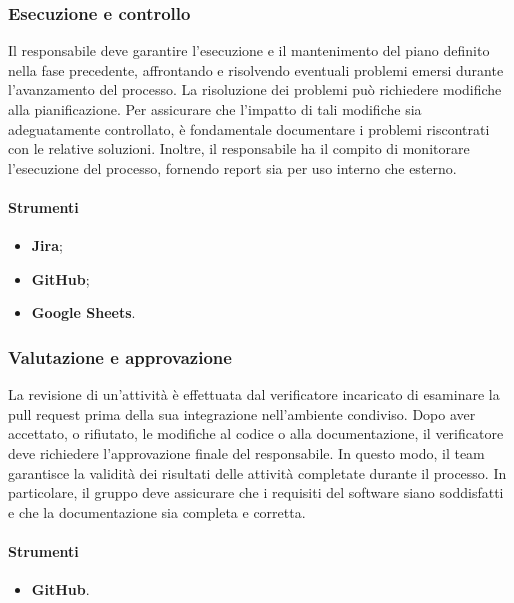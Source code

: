 \subsubsection{Esecuzione e controllo}
\par Il responsabile deve garantire l'esecuzione e il mantenimento del piano definito nella fase precedente, affrontando e risolvendo eventuali problemi emersi durante l'avanzamento del processo. La risoluzione dei problemi può richiedere modifiche alla pianificazione. Per assicurare che l'impatto di tali modifiche sia adeguatamente controllato, è fondamentale documentare i problemi riscontrati con le relative soluzioni. Inoltre, il responsabile ha il compito di monitorare l'esecuzione del processo, fornendo report sia per uso interno che esterno.

\paragraph*{Strumenti}
\IntroStrumenti
\begin{itemize}
  \item \textbf{Jira};
  \item \textbf{GitHub};
  \item \textbf{Google Sheets}.
\end{itemize}

\subsubsection{Valutazione e approvazione}
\par La revisione di un'attività è effettuata dal verificatore incaricato di esaminare la pull request prima della sua integrazione nell'ambiente condiviso. Dopo aver accettato, o rifiutato, le modifiche al codice o alla documentazione, il verificatore deve richiedere l'approvazione finale del responsabile. In questo modo, il team garantisce la validità dei risultati delle attività completate durante il processo. In particolare, il gruppo deve assicurare che i requisiti del software siano soddisfatti e che la documentazione sia completa e corretta.

\paragraph*{Strumenti}
\begin{itemize}
  \item \textbf{GitHub}.
\end{itemize}

